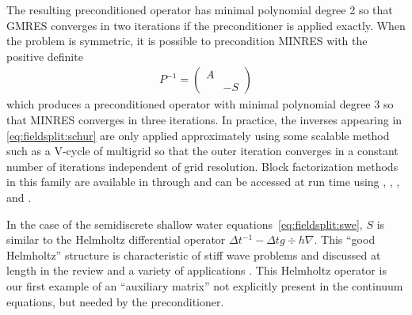 The resulting preconditioned operator has minimal polynomial degree 2 so that GMRES converges in two iterations if the preconditioner is applied exactly.
When the problem is symmetric, it is possible to precondition MINRES with the positive definite
\begin{align*}
  P^{-1} = \begin{pmatrix} A & \\ & -S \end{pmatrix}
\end{align*}
which produces a preconditioned operator with minimal polynomial degree 3 so that MINRES converges in three iterations.
In practice, the inverses appearing in \eqref{eq:fieldsplit:schur} are only applied approximately using some scalable method such as a V-cycle of multigrid so that the outer iteration converges in a constant number of iterations independent of grid resolution.
Block factorization methods in this family are available in {\PETSc} through  and can be accessed at run time using , , , and .

In the case of the semidiscrete shallow water equations~\eqref{eq:fieldsplit:swe}, $S$ is similar to the Helmholtz differential operator $\Delta t^{-1} - \Delta t g \div h \nabla$.
This ``good Helmholtz'' structure is characteristic of stiff wave problems and discussed at length in the review \citep{knoll2005jfn} and a variety of applications \citep{mousseau2002inc,chacon2008optimal,park2009physics}.
This Helmholtz operator is our first example of an ``auxiliary matrix'' not explicitly present in the continuum equations, but needed by the preconditioner.

